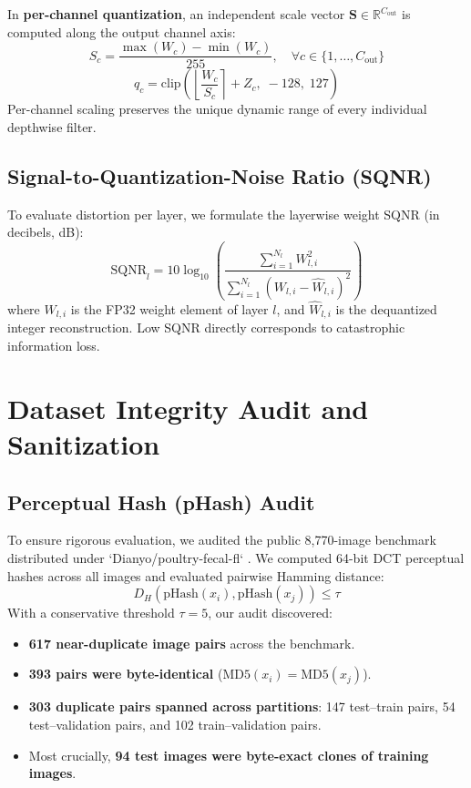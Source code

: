 \documentclass[11pt,a4paper]{article}
\begin{document}
In \textbf{per-channel quantization}, an independent scale vector $\mathbf{S} \in \mathbb{R}^{C_{\text{out}}}$ is computed along the output channel axis:
\begin{equation}
S_c = \frac{\max(W_c) - \min(W_c)}{255}, \quad \forall c \in \{1, \dots, C_{\text{out}}\}
\end{equation}
\begin{equation}
q_c = \text{clip}\left(\left\lfloor \frac{W_c}{S_c} \right\rceil + Z_c, \; -128, \; 127\right)
\end{equation}
Per-channel scaling preserves the unique dynamic range of every individual depthwise filter.

\subsection{Signal-to-Quantization-Noise Ratio (SQNR)}
To evaluate distortion per layer, we formulate the layerwise weight SQNR (in decibels, dB):
\begin{equation}
\text{SQNR}_l = 10 \log_{10} \left( \frac{\sum_{i=1}^{N_l} W_{l,i}^2}{\sum_{i=1}^{N_l} (W_{l,i} - \hat{W}_{l,i})^2} \right)
\end{equation}
where $W_{l,i}$ is the FP32 weight element of layer $l$, and $\hat{W}_{l,i}$ is the dequantized integer reconstruction. Low SQNR directly corresponds to catastrophic information loss.

\section{Dataset Integrity Audit and Sanitization}

\subsection{Perceptual Hash (pHash) Audit}
To ensure rigorous evaluation, we audited the public 8,770-image benchmark distributed under `Dianyo/poultry-fecal-fl` \cite{chi2026}. We computed 64-bit DCT perceptual hashes across all images and evaluated pairwise Hamming distance:
\begin{equation}
D_H(\text{pHash}(x_i), \text{pHash}(x_j)) \le \tau
\end{equation}
With a conservative threshold $\tau = 5$, our audit discovered:
\begin{itemize}
    \item \textbf{617 near-duplicate image pairs} across the benchmark.
    \item \textbf{393 pairs were byte-identical} ($\text{MD5}(x_i) = \text{MD5}(x_j)$).
    \item \textbf{303 duplicate pairs spanned across partitions}: 147 test--train pairs, 54 test--validation pairs, and 102 train--validation pairs.
    \item Most crucially, \textbf{94 test images were byte-exact clones of training images}.
\end{itemize}
\end{document}
